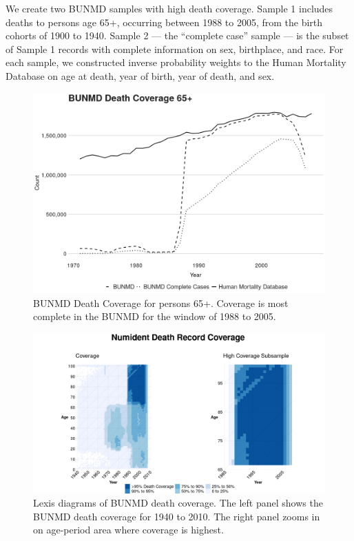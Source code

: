 \documentclass[
  11pt,
]{article}
\begin{document}
We create two BUNMD samples with high death coverage. Sample 1 includes
deaths to persons age 65+, occurring between 1988 to 2005, from the
birth cohorts of 1900 to 1940. Sample 2 --- the ``complete case'' sample
--- is the subset of Sample 1 records with complete information on sex,
birthplace, and race. For each sample, we constructed inverse
probability weights to the Human Mortality Database on age at death,
year of birth, year of death, and sex.

\begin{figure}[H]
  \centering
  \includegraphics[width=6.5in]{../illustrations/bunmd_coverage.png}
  \caption{BUNMD Death Coverage for persons 65+. Coverage is most complete in the BUNMD for the window of 1988 to 2005.}
  \label{fig:bunmd_coverage}
\end{figure}

\begin{figure}[H]
  \centering
  \includegraphics[width=7in]{../illustrations/lexis_combine_plot.png}
  \caption{Lexis diagrams of BUNMD death coverage. The left panel shows the BUNMD death coverage for 1940 to 2010. The right panel zooms in on age-period area where coverage is highest.}
  \label{fig:bunmd_lexis}
\end{figure}
\end{document}
